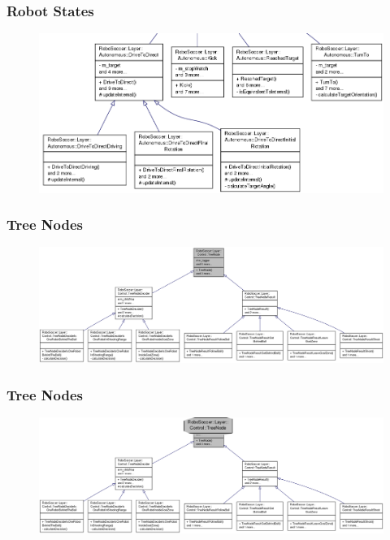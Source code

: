 \documentclass[hyperref={pdfpagelabels=false},compress]{beamer}
\begin{document}
\begin{frame}
	\frametitle{Robot States}
	\center
	\begin{figure}
		\centering
		\includegraphics[width = \textwidth]{inheritance_graph_robotstates_rest.png}
	\end{figure}
\end{frame}

\begin{frame}
	\frametitle{Tree Nodes}
	\center
	\begin{figure}
		\centering
		\includegraphics[width = \textwidth]{inheritance_graph_treenode.png}
	\end{figure}
\end{frame}

\begin{frame}
	\frametitle{Tree Nodes}
	\center
	\begin{figure}
		\centering
		\includegraphics[width = \textwidth]{inheritance_graph_treenode_zoomed.png}
	\end{figure}
\end{frame}
\end{document}
